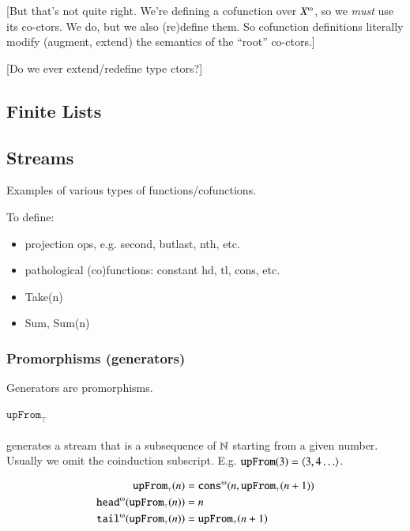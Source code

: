 [But that's not quite right. We're defining a cofunction over
  \(\colist{X}\), so we \textit{must} use its co-ctors. We do, but we
  also (re)define them. So cofunction definitions literally modify
  (augment, extend) the semantics of the ``root'' co-ctors.]

[Do we ever extend/redefine type ctors?]

\subsection{Finite Lists}

\subsection{Streams}

Examples of various types of functions/cofunctions.

To define:

\begin{itemize}
\item projection ops, e.g. second, butlast, nth, etc.
\item pathological (co)functions: constant hd, tl, cons, etc.
\item Take(n)
\item Sum, Sum(n)
\end{itemize}


\subsubsection{Promorphisms (generators)}

Generators are promorphisms.

\paragraph{\(\texttt{upFrom}_{\scriptscriptstyle\top}\)}
generates a stream that is a subsequence of \(\Nat\) starting from a
given number. Usually we omit the coinduction subscript. E.g.
\(\texttt{upFrom}(3) = \stream{3}{4}\).


\begin{prooftree}
\end{prooftree}

\begin{alignat}{2}
  \codefn{upFrom}(n) &= \cocons(n, \codefn{upFrom}(n+1)) \\
  \cohead(\codefn{upFrom}(n)) &= n \\
  \cotail(\codefn{upFrom}(n)) &= \codefn{upFrom}(n+1)
\end{alignat}


